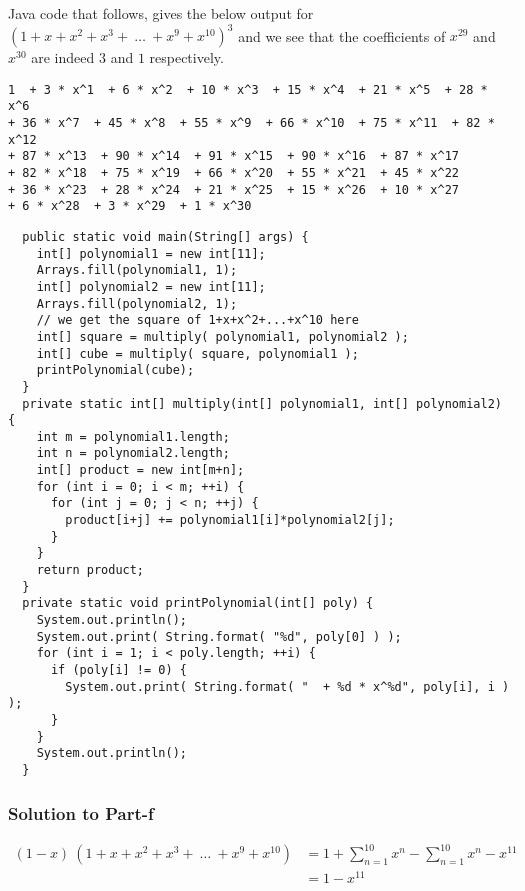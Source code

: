 \documentclass[12pt]{article}
\begin{document}
Java code that follows, gives the below output for \\$\left( 1+x+x^2+x^3+\ \ldots\ +x^9+x^{10} \right)^3$ and we see that the coefficients of $x^{29}$ and $x^{30}$ are indeed $3$ and $1$ respectively. 

\begin{verbatim}
1  + 3 * x^1  + 6 * x^2  + 10 * x^3  + 15 * x^4  + 21 * x^5  + 28 * x^6  
+ 36 * x^7  + 45 * x^8  + 55 * x^9  + 66 * x^10  + 75 * x^11  + 82 * x^12  
+ 87 * x^13  + 90 * x^14  + 91 * x^15  + 90 * x^16  + 87 * x^17  
+ 82 * x^18  + 75 * x^19  + 66 * x^20  + 55 * x^21  + 45 * x^22  
+ 36 * x^23  + 28 * x^24  + 21 * x^25  + 15 * x^26  + 10 * x^27  
+ 6 * x^28  + 3 * x^29  + 1 * x^30
\end{verbatim}
\begin{verbatim}
  public static void main(String[] args) {
    int[] polynomial1 = new int[11];
    Arrays.fill(polynomial1, 1); 
    int[] polynomial2 = new int[11];
    Arrays.fill(polynomial2, 1);
    // we get the square of 1+x+x^2+...+x^10 here
    int[] square = multiply( polynomial1, polynomial2 );
    int[] cube = multiply( square, polynomial1 );
    printPolynomial(cube);
  }
  private static int[] multiply(int[] polynomial1, int[] polynomial2) {
    int m = polynomial1.length;
    int n = polynomial2.length;
    int[] product = new int[m+n];
    for (int i = 0; i < m; ++i) {
      for (int j = 0; j < n; ++j) {
        product[i+j] += polynomial1[i]*polynomial2[j];
      }
    }
    return product;
  }
  private static void printPolynomial(int[] poly) {
    System.out.println();
    System.out.print( String.format( "%d", poly[0] ) );
    for (int i = 1; i < poly.length; ++i) {
      if (poly[i] != 0) {
        System.out.print( String.format( "  + %d * x^%d", poly[i], i ) );
      }
    }
    System.out.println();
  }
\end{verbatim}

\subsubsection*{Solution to Part-f}
\begin{displaymath}
\begin{split}
(1-x)\ \left( 1+x+x^2+x^3+\ \ldots\ +x^9+x^{10} \right) &= 1+\sum_{n=1}^{10}x^n-\sum_{n=1}^{10}x^n-x^{11}\\
														&= 1-x^{11}
\end{split}
\end{displaymath}
\end{document}
